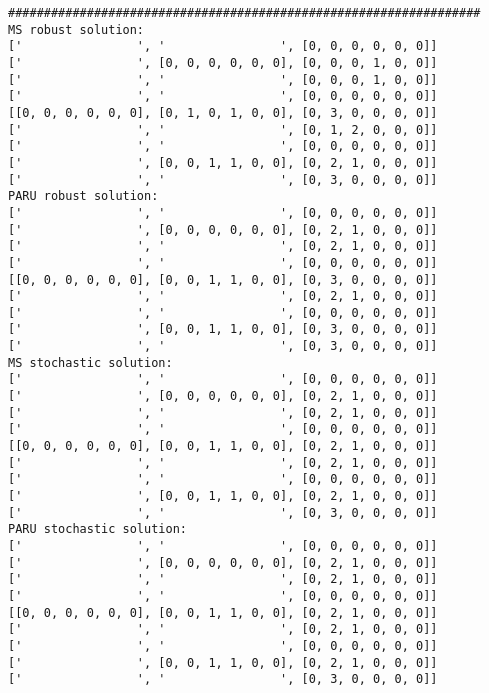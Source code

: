 \documentclass[10pt]{article}
\theoremstyle{plain}
\theoremstyle{definition}
\theoremstyle{remark}
\begin{document}
\begin{minipage}[t]{8cm}
\tiny
\begin{verbatim}
##################################################################
MS robust solution:
['                ', '                ', [0, 0, 0, 0, 0, 0]]
['                ', [0, 0, 0, 0, 0, 0], [0, 0, 0, 1, 0, 0]]
['                ', '                ', [0, 0, 0, 1, 0, 0]]
['                ', '                ', [0, 0, 0, 0, 0, 0]]
[[0, 0, 0, 0, 0, 0], [0, 1, 0, 1, 0, 0], [0, 3, 0, 0, 0, 0]]
['                ', '                ', [0, 1, 2, 0, 0, 0]]
['                ', '                ', [0, 0, 0, 0, 0, 0]]
['                ', [0, 0, 1, 1, 0, 0], [0, 2, 1, 0, 0, 0]]
['                ', '                ', [0, 3, 0, 0, 0, 0]]
PARU robust solution:
['                ', '                ', [0, 0, 0, 0, 0, 0]]
['                ', [0, 0, 0, 0, 0, 0], [0, 2, 1, 0, 0, 0]]
['                ', '                ', [0, 2, 1, 0, 0, 0]]
['                ', '                ', [0, 0, 0, 0, 0, 0]]
[[0, 0, 0, 0, 0, 0], [0, 0, 1, 1, 0, 0], [0, 3, 0, 0, 0, 0]]
['                ', '                ', [0, 2, 1, 0, 0, 0]]
['                ', '                ', [0, 0, 0, 0, 0, 0]]
['                ', [0, 0, 1, 1, 0, 0], [0, 3, 0, 0, 0, 0]]
['                ', '                ', [0, 3, 0, 0, 0, 0]]
MS stochastic solution:
['                ', '                ', [0, 0, 0, 0, 0, 0]]
['                ', [0, 0, 0, 0, 0, 0], [0, 2, 1, 0, 0, 0]]
['                ', '                ', [0, 2, 1, 0, 0, 0]]
['                ', '                ', [0, 0, 0, 0, 0, 0]]
[[0, 0, 0, 0, 0, 0], [0, 0, 1, 1, 0, 0], [0, 2, 1, 0, 0, 0]]
['                ', '                ', [0, 2, 1, 0, 0, 0]]
['                ', '                ', [0, 0, 0, 0, 0, 0]]
['                ', [0, 0, 1, 1, 0, 0], [0, 2, 1, 0, 0, 0]]
['                ', '                ', [0, 3, 0, 0, 0, 0]]
PARU stochastic solution:
['                ', '                ', [0, 0, 0, 0, 0, 0]]
['                ', [0, 0, 0, 0, 0, 0], [0, 2, 1, 0, 0, 0]]
['                ', '                ', [0, 2, 1, 0, 0, 0]]
['                ', '                ', [0, 0, 0, 0, 0, 0]]
[[0, 0, 0, 0, 0, 0], [0, 0, 1, 1, 0, 0], [0, 2, 1, 0, 0, 0]]
['                ', '                ', [0, 2, 1, 0, 0, 0]]
['                ', '                ', [0, 0, 0, 0, 0, 0]]
['                ', [0, 0, 1, 1, 0, 0], [0, 2, 1, 0, 0, 0]]
['                ', '                ', [0, 3, 0, 0, 0, 0]]
\end{verbatim}
\end{minipage}
\end{document}
